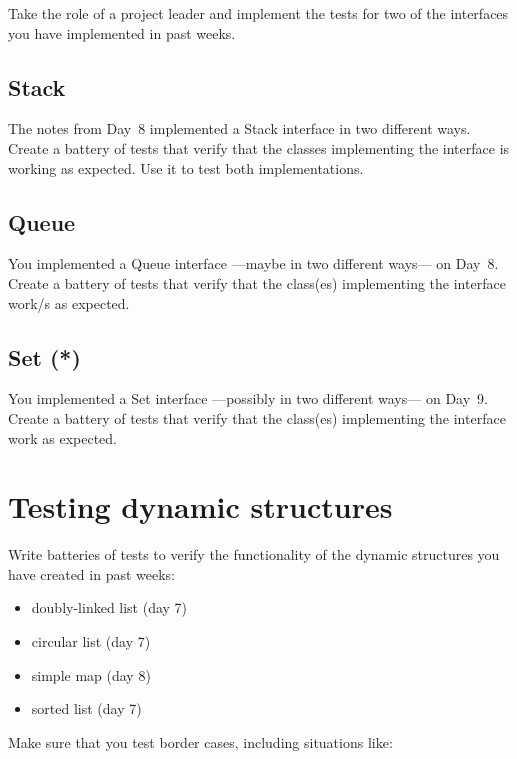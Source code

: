 \documentclass{article}
\begin{document}
Take the role of a project leader and implement the tests for two of
the interfaces you have implemented in past weeks. 

\subsection{Stack}
\label{sec:stack3}

The notes from Day~8 implemented a Stack interface in two different
ways. Create a battery of tests that verify that the classes
implementing the interface is working as expected. Use it to test both
implementations.

\subsection{Queue}
\label{sec:stack2}

You implemented a Queue interface ---maybe in two different ways--- on
Day~8. Create a battery of tests that verify that the class(es)
implementing the interface work/s as expected. 

\subsection{Set (*)}
\label{sec:stack5}

You implemented a Set interface ---possibly in two different ways--- on
Day~9. Create a battery of tests that verify that the class(es)
implementing the interface work as expected. 


\section{Testing dynamic structures}
\label{sec:testing-maps}

Write batteries of tests to verify the functionality of the dynamic
structures you have created in past weeks: 


\begin{itemize}
\item doubly-linked list (day 7)
\item circular list (day 7)
\item simple map (day 8)
\item sorted list (day 7)
\end{itemize}

Make sure that you test border cases, including situations like: 
\end{document}
